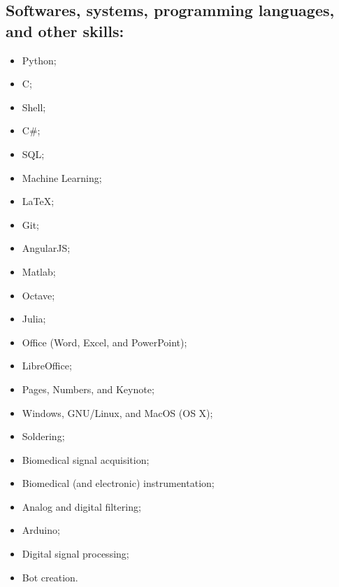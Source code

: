 \documentclass[11pt]{article}
\begin{document}
\subsection{Softwares, systems, programming languages, and other skills:}
\begin{multicols}{3} %
\begin{itemize}
    \item Python;
    \item C;
    \item Shell;
    \item C\#;
    \item SQL;
    \item Machine Learning;
    \item \LaTeX ;
    \item Git;
    \item AngularJS;
    \item Matlab;
    \item Octave;
    \item Julia;
    \item Office (Word, Excel, and PowerPoint);
    \item LibreOffice;
    \item Pages, Numbers, and Keynote;
    \item Windows, GNU/Linux, and MacOS (OS X);
    \item Soldering;
    \item Biomedical signal acquisition;
    \item Biomedical (and electronic) instrumentation;
    \item Analog and digital filtering;
    \item Arduino;
    \item Digital signal processing;
    \item Bot creation.
\end{itemize}
\end{multicols}
\end{document}

